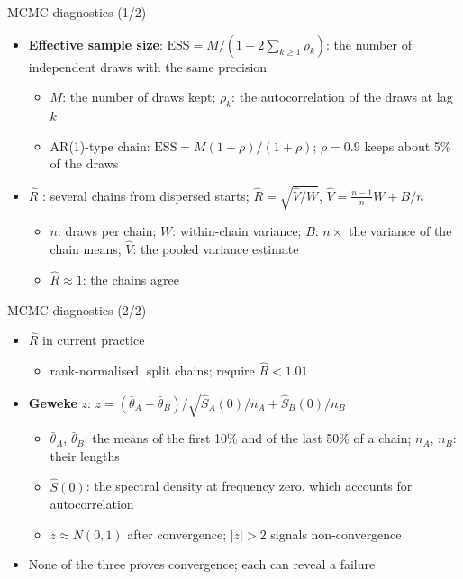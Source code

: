 \begin{frame}{MCMC diagnostics (1/2)}
\itemsize{\small}
\begin{itemize}
    \item \textbf{Effective sample size}: $\mathrm{ESS} = M/(1 + 2\sum_{k\ge1}\rho_k)$: the number of independent draws with the same precision
    \begin{itemize}
        \item $M$: the number of draws kept; $\rho_k$: the autocorrelation of the draws at lag $k$
        \item AR(1)-type chain: $\mathrm{ESS} = M(1 - \rho)/(1 + \rho)$; $\rho = 0.9$ keeps about 5\% of the draws
    \end{itemize}
    \item \textbf{$\widehat R$} : several chains from dispersed starts; $\widehat R = \sqrt{\hat V/W}$, $\hat V = \frac{n-1}{n}W + B/n$
    \begin{itemize}
        \item $n$: draws per chain; $W$: within-chain variance; $B$: $n\times$ the variance of the chain means; $\hat V$: the pooled variance estimate
        \item $\widehat R \approx 1$: the chains agree
    \end{itemize}
\end{itemize}
\end{frame}

\begin{frame}{MCMC diagnostics (2/2)}
\itemsize{\small}
\begin{itemize}
    \item $\widehat R$ in current practice 
    \begin{itemize}
        \item rank-normalised, split chains; require $\widehat R < 1.01$
    \end{itemize}
    \item \textbf{Geweke} $z$: $z = (\bar\theta_A - \bar\theta_B)/\sqrt{\hat S_A(0)/n_A + \hat S_B(0)/n_B}$
    \begin{itemize}
        \item $\bar\theta_A$, $\bar\theta_B$: the means of the first 10\% and of the last 50\% of a chain; $n_A$, $n_B$: their lengths
        \item $\hat S(0)$: the spectral density at frequency zero, which accounts for autocorrelation
        \item $z \approx N(0, 1)$ after convergence; $|z| > 2$ signals non-convergence
    \end{itemize}
    \item None of the three proves convergence; each can reveal a failure
\end{itemize}
\end{frame}


